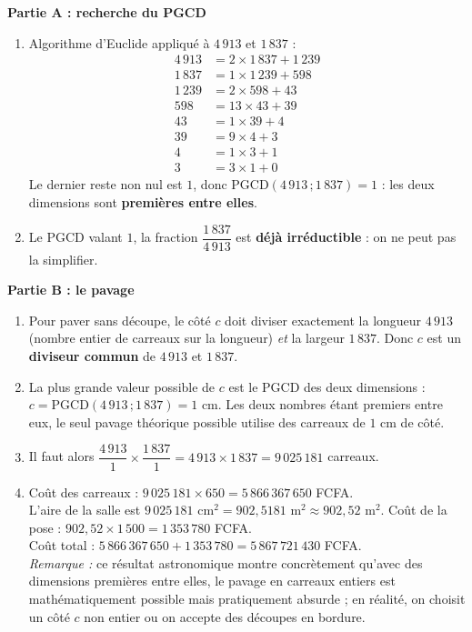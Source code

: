 \documentclass[11pt]{article}
\begin{document}
\begin{corrige}
\textbf{Partie A : recherche du PGCD}
\begin{enumerate}
\item Algorithme d'Euclide appliqué à $4\,913$ et $1\,837$ :
\begin{align*}
4\,913 &= 2 \times 1\,837 + 1\,239\\
1\,837 &= 1 \times 1\,239 + 598\\
1\,239 &= 2 \times 598 + 43\\
598 &= 13 \times 43 + 39\\
43 &= 1 \times 39 + 4\\
39 &= 9 \times 4 + 3\\
4 &= 1 \times 3 + 1\\
3 &= 3 \times 1 + 0
\end{align*}
Le dernier reste non nul est $1$, donc $\mathrm{PGCD}(4\,913\,;1\,837) = 1$ : les deux dimensions sont \textbf{premières entre elles}.
\item Le PGCD valant $1$, la fraction $\dfrac{1\,837}{4\,913}$ est \textbf{déjà irréductible} : on ne peut pas la simplifier.
\end{enumerate}

\textbf{Partie B : le pavage}
\begin{enumerate}
\item Pour paver sans découpe, le côté $c$ doit diviser exactement la longueur $4\,913$ (nombre entier de carreaux sur la longueur) \emph{et} la largeur $1\,837$. Donc $c$ est un \textbf{diviseur commun} de $4\,913$ et $1\,837$.
\item La plus grande valeur possible de $c$ est le PGCD des deux dimensions : $c = \mathrm{PGCD}(4\,913\,;1\,837) = 1$ cm. Les deux nombres étant premiers entre eux, le seul pavage théorique possible utilise des carreaux de $1$ cm de côté.
\item Il faut alors $\dfrac{4\,913}{1} \times \dfrac{1\,837}{1} = 4\,913 \times 1\,837 = 9\,025\,181$ carreaux.
\item Coût des carreaux : $9\,025\,181 \times 650 = 5\,866\,367\,650$ FCFA. \\
L'aire de la salle est $9\,025\,181$ cm$^2 = 902,5181$ m$^2 \approx 902,52$ m$^2$. Coût de la pose : $902,52 \times 1\,500 = 1\,353\,780$ FCFA. \\
Coût total : $5\,866\,367\,650 + 1\,353\,780 = 5\,867\,721\,430$ FCFA. \\
\emph{Remarque :} ce résultat astronomique montre concrètement qu'avec des dimensions premières entre elles, le pavage en carreaux entiers est mathématiquement possible mais pratiquement absurde ; en réalité, on choisit un côté $c$ non entier ou on accepte des découpes en bordure.
\end{enumerate}


\end{corrige}
\end{document}
